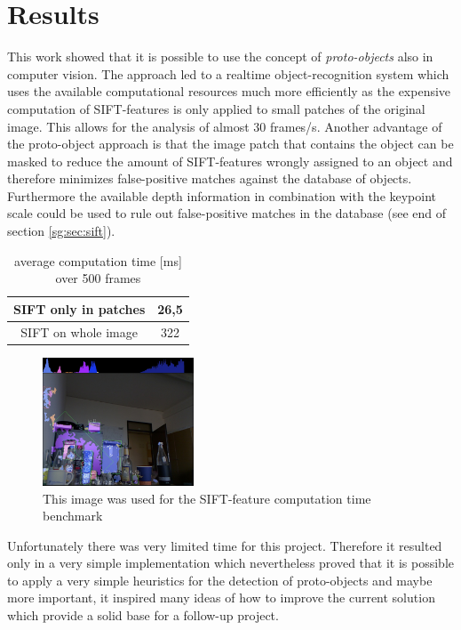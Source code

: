 \chapter{Results} %
\label{sg:cha:results}

This work showed that it is possible to use the concept of \emph{proto-objects} also in computer vision. The approach led to a realtime object-recognition system which uses the available computational resources much more efficiently as the expensive computation of SIFT-features is only applied to small patches of the original image. This allows for the analysis of almost 30 frames/s. Another advantage of the proto-object approach is that the image patch that contains the object can be masked to reduce the amount of SIFT-features wrongly assigned to an object and therefore minimizes false-positive matches against the database of objects. Furthermore the available depth information in combination with the keypoint scale could be used to rule out false-positive matches in the database (see end of section \ref{sg:sec:sift}).

\begin{table}[ht]
    \centering
    \begin{tabular}{cc}
    \hline
    SIFT only in patches & 26,5\\
    \hline
    SIFT on whole image & 322\\
    \hline
    \end{tabular}
    \caption{average computation time [ms] over 500 frames}
\end{table}
\begin{figure}[ht]
    \centering
        \includegraphics[width=0.4\textwidth]{images/benchmark.jpg}
    \caption{This image was used for the SIFT-feature computation time benchmark}
    \label{sg:fig:images_benchmark}
\end{figure}

Unfortunately there was very limited time for this project. Therefore it resulted only in a very simple implementation which nevertheless proved that it is possible to apply a very simple heuristics for the detection of proto-objects and maybe more important, it inspired many ideas of how to improve the current solution which provide a solid base for a follow-up project.

